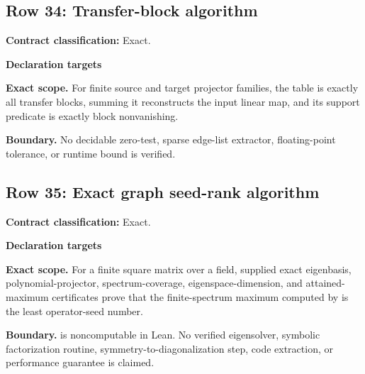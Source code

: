 \subsection{Row 34: Transfer-block algorithm}
\label{row:34}
\textbf{Contract classification:} Exact.
\par\smallskip\textbf{Declaration targets}\par
{\small\noindent{}\par}
{\small\noindent{}\par}
{\small\noindent{}\par}
{\small\noindent{}\par}
\medskip\noindent\textbf{Exact scope.} For finite source and target projector families, the table is exactly all transfer blocks, summing it reconstructs the input linear map, and its support predicate is exactly block nonvanishing.
\par\smallskip\noindent\textbf{Boundary.} No decidable zero-test, sparse edge-list extractor, floating-point tolerance, or runtime bound is verified.
\medskip
\subsection{Row 35: Exact graph seed-rank algorithm}
\label{row:35}
\textbf{Contract classification:} Exact.
\par\smallskip\textbf{Declaration targets}\par
{\small\noindent{}\par}
{\small\noindent{}\par}
\medskip\noindent\textbf{Exact scope.} For a finite square matrix over a field, supplied exact eigenbasis, polynomial-projector, spectrum-coverage, eigenspace-dimension, and attained-maximum certificates prove that the finite-spectrum maximum computed by  is the least operator-seed number.
\par\smallskip\noindent\textbf{Boundary.}  is noncomputable in Lean. No verified eigensolver, symbolic factorization routine, symmetry-to-diagonalization step, code extraction, or performance guarantee is claimed.
\medskip
